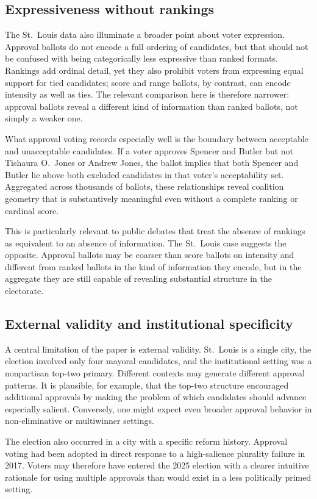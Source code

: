 \documentclass[11pt]{article}
\begin{document}
\subsection{Expressiveness without rankings}
The St.~Louis data also illuminate a broader point about voter expression. Approval ballots do not encode a full ordering of candidates, but that should not be confused with being categorically less expressive than ranked formats. Rankings add ordinal detail, yet they also prohibit voters from expressing equal support for tied candidates; score and range ballots, by contrast, can encode intensity as well as ties. The relevant comparison here is therefore narrower: approval ballots reveal a different kind of information than ranked ballots, not simply a weaker one.

What approval voting records especially well is the boundary between acceptable and unacceptable candidates. If a voter approves Spencer and Butler but not Tishaura O.~Jones or Andrew Jones, the ballot implies that both Spencer and Butler lie above both excluded candidates in that voter's acceptability set. Aggregated across thousands of ballots, these relationships reveal coalition geometry that is substantively meaningful even without a complete ranking or cardinal score.

This is particularly relevant to public debates that treat the absence of rankings as equivalent to an absence of information. The St.~Louis case suggests the opposite. Approval ballots may be coarser than score ballots on intensity and different from ranked ballots in the kind of information they encode, but in the aggregate they are still capable of revealing substantial structure in the electorate.

\subsection{External validity and institutional specificity}
A central limitation of the paper is external validity. St.~Louis is a single city, the election involved only four mayoral candidates, and the institutional setting was a nonpartisan top-two primary. Different contexts may generate different approval patterns. It is plausible, for example, that the top-two structure encouraged additional approvals by making the problem of which candidates should advance especially salient. Conversely, one might expect even broader approval behavior in non-eliminative or multiwinner settings.

The election also occurred in a city with a specific reform history. Approval voting had been adopted in direct response to a high-salience plurality failure in 2017. Voters may therefore have entered the 2025 election with a clearer intuitive rationale for using multiple approvals than would exist in a less politically primed setting.
\end{document}
